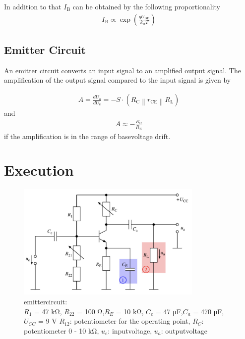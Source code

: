 \documentclass[11pt, a4paper]{article}
\begin{document}
In addition to that $I_{\mathrm{B}}$ can be obtained by the following proportionality 
\begin{align}
    I_{\mathrm{B}} \propto \exp \left(\frac{q U_{\mathrm{BE}}}{k_{\mathrm{B}} T}\right)
    \label{eq:Ib_T}
\end{align}

\FloatBarrier
\subsection{Emitter Circuit}
An emitter circuit converts an input signal to an amplified output signal. The amplification of the output signal compared to the input signal is given by


\begin{align}
    A=\frac{d U_{\mathrm{a}}}{d U_{\mathrm{e}}}=-S \cdot\left(R_{\mathrm{C}}\left\|r_{\mathrm{CE}}\right\| R_{\mathrm{L}}\right)
    \label{eq:ampEasy}
\end{align}
and 
\begin{align}
A \approx-\frac{R_{\mathrm{C}} }{R_{\mathrm{E}}}
\label{eq:ampDrift}
\end{align}
if the amplification is in the range of basevoltage drift.
\section{Execution}
\begin{figure}[h]
    \centering
    \includegraphics[width=0.8\textwidth]{bilder/Emitter circuit.png}
    \caption{emittercircuit:\\
    $R_1$ = 47 \si{\kilo\ohm}, $R_{22}$ = 100 \si{\ohm},$R_E$ = 10 \si{\kilo\ohm}, $C_e$ = 47 \si{\micro\farad},$C_a$ = 470 \si{\micro\farad}, $U_{CC}$ = 9 \si{\volt} 
    $R_{12}$: potentiometer for the operating point, $R_C$: potentiometer 0 - 10 \si{\kilo\ohm}, $u_e$: inputvoltage, $u_a$: outputvoltage
    }
    \label{im:Emcir}
\end{figure}
\end{document}

